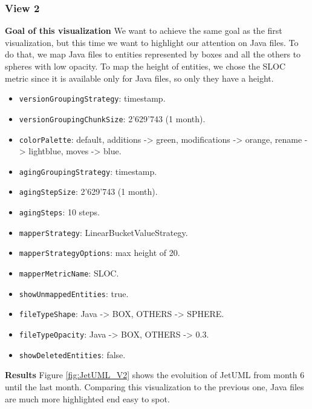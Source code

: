 \subsubsection*{View 2}
\textbf{Goal of this visualization}
We want to achieve the same goal as the first visualization, but this time we want to highlight our attention on Java files. 
To do that, we map Java files to entities represented by boxes and all the others to spheres with low opacity. 
To map the height of entities, we chose the SLOC metric since it is available only for Java files, so only they have a height. 

\begin{itemize}
    \item \texttt{versionGroupingStrategy}: timestamp.
    \item \texttt{versionGroupingChunkSize}: 2'629'743 (1 month). 
    \item \texttt{colorPalette}: default, additions -> green, modifications -> orange, rename -> lightblue, moves -> blue.
    \item \texttt{agingGroupingStrategy}: timestamp.
    \item \texttt{agingStepSize}: 2'629'743 (1 month).
    \item \texttt{agingSteps}: 10 steps. 
    \item \texttt{mapperStrategy}: LinearBucketValueStrategy.
    \item \texttt{mapperStrategyOptions}: max height of 20.
    \item \texttt{mapperMetricName}: SLOC. 
    \item \texttt{showUnmappedEntities}: true.
    \item \texttt{fileTypeShape}: Java -> BOX, OTHERS -> SPHERE. 
    \item \texttt{fileTypeOpacity}: Java -> BOX, OTHERS -> 0.3. 
    \item \texttt{showDeletedEntities}: false.
\end{itemize}

\textbf{Results}
Figure \ref{fig:JetUML_V2} shows the evoluition of JetUML from month 6 until the last month. 
Comparing this visualization to the previous one, Java files are much more highlighted end easy to spot. 


